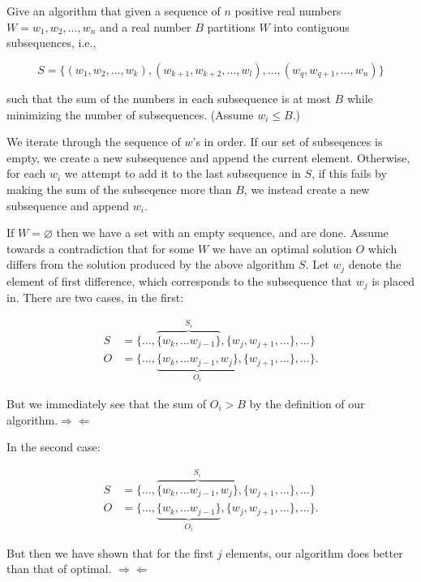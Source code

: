 \documentclass{amsart}
\theoremstyle{definition}
\theoremstyle{remark}
\numberwithin{equation}{section}
\let\null\varnothing
\begin{document}
\section{} Give an algorithm that given a sequence of $n$ positive real numbers $W = w_1, w_2,
\ldots, w_n$ and a real number $B$ partitions $W$ into contiguous subsequences, i.e.,

$$ S = \{ (w_1,w_2,\ldots,w_k), (w_{k+1},w_{k+2},\ldots,w_l),\ldots,(w_q,w_{q+1},\ldots,w_n) \} $$

such that the sum of the numbers in each subsequence is at most $B$ while
minimizing the number of subsequences. (Assume $w_i \leq B$.)

\algstar We iterate through the sequence of $w$'s in order. If our set
of subseqences is empty, we create a new subsequence and append the
current element. Otherwise, for each $w_i$ we attempt to add it to
the last subsequence in $S$, if this fails by making the sum of the
subseqence more than $B$, we instead create a new subsequence and append
$w_i$.

\proof If $W = \null$ then we have a set with an empty sequence, and
are done. Assume towards a contradiction that for some $W$ we have an
optimal solution $O$ which differs from the solution produced by the
above algorithm $S$. Let $w_j$ denote the element of first difference,
which corresponds to the subsequence that $w_j$ is placed in. There are
two cases, in the first:

\begin{align*}
  S &= \{ \ldots, \overbrace{\{w_k, \ldots  w_{j-1}\} }^{S_i}, \{w_j, w_{j+1},\ldots \}, \ldots \} \\
  O &= \{ \ldots, \underbrace{\{w_k, \ldots w_{j-1}, w_j \}}_{O_i}, \{w_{j+1},\ldots \}, \ldots \}.
\end{align*}

But we immediately see that the sum of $O_i > B$ by the definition of our
algorithm.$\Rightarrow \Leftarrow$

In the second case:

\begin{align*}
  S &= \{ \ldots, \overbrace{\{w_k, \ldots  w_{j-1}, w_j \} }^{S_i}, \{w_{j+1},\ldots \}, \ldots \} \\
  O &= \{ \ldots, \underbrace{\{w_k, \ldots w_{j-1} \}}_{O_i}, \{ w_j, w_{j+1},\ldots \}, \ldots \}.
\end{align*}

But then we have shown that for the first $j$ elements, our algorithm does better than
that of optimal. $\Rightarrow \Leftarrow$
\end{document}
